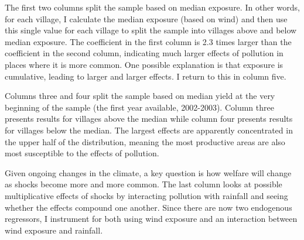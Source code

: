 \documentclass[
]{article}
\begin{document}
The first two columns split the sample based on median exposure. In other words, for each village, I calculate the median exposure (based on wind) and then use this single value for each village to split the sample into villages above and below median exposure. The coefficient in the first column is 2.3 times larger than the coefficient in the second column, indicating much larger effects of pollution in places where it is more common. One possible explanation is that exposure is cumulative, leading to larger and larger effects. I return to this in column five.

Columns three and four split the sample based on median yield at the very beginning of the sample (the first year available, 2002-2003). Column three presents results for villages above the median while column four presents results for villages below the median. The largest effects are apparently concentrated in the upper half of the distribution, meaning the most productive areas are also most susceptible to the effects of pollution.

Given ongoing changes in the climate, a key question is how welfare will change as shocks become more and more common. The last column looks at possible multiplicative effects of shocks by interacting pollution with rainfall and seeing whether the effects compound one another. Since there are now two endogenous regressors, I instrument for both using wind exposure and an interaction between wind exposure and rainfall.
\end{document}
